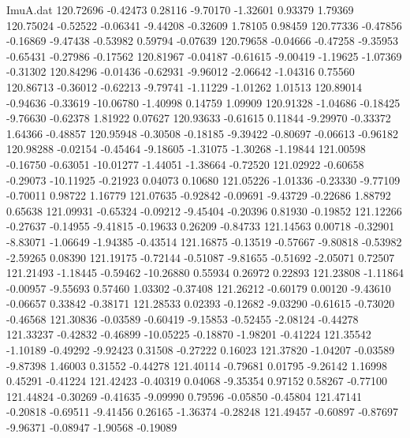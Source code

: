 \begin{filecontents}{ImuA.dat}
 120.72696   -0.42473    0.28116   -9.70170   -1.32601    0.93379    1.79369
 120.75024   -0.52522   -0.06341   -9.44208   -0.32609    1.78105    0.98459
 120.77336   -0.47856   -0.16869   -9.47438   -0.53982    0.59794   -0.07639
 120.79658   -0.04666   -0.47258   -9.35953   -0.65431   -0.27986   -0.17562
 120.81967   -0.04187   -0.61615   -9.00419   -1.19625   -1.07369   -0.31302
 120.84296   -0.01436   -0.62931   -9.96012   -2.06642   -1.04316    0.75560
 120.86713   -0.36012   -0.62213   -9.79741   -1.11229   -1.01262    1.01513
 120.89014   -0.94636   -0.33619  -10.06780   -1.40998    0.14759    1.09909
 120.91328   -1.04686   -0.18425   -9.76630   -0.62378    1.81922    0.07627
 120.93633   -0.61615    0.11844   -9.29970   -0.33372    1.64366   -0.48857
 120.95948   -0.30508   -0.18185   -9.39422   -0.80697   -0.06613   -0.96182
 120.98288   -0.02154   -0.45464   -9.18605   -1.31075   -1.30268   -1.19844
 121.00598   -0.16750   -0.63051  -10.01277   -1.44051   -1.38664   -0.72520
 121.02922   -0.60658   -0.29073  -10.11925   -0.21923    0.04073    0.10680
 121.05226   -1.01336   -0.23330   -9.77109   -0.70011    0.98722    1.16779
 121.07635   -0.92842   -0.09691   -9.43729   -0.22686    1.88792    0.65638
 121.09931   -0.65324   -0.09212   -9.45404   -0.20396    0.81930   -0.19852
 121.12266   -0.27637   -0.14955   -9.41815   -0.19633    0.26209   -0.84733
 121.14563    0.00718   -0.32901   -8.83071   -1.06649   -1.94385   -0.43514
 121.16875   -0.13519   -0.57667   -9.80818   -0.53982   -2.59265    0.08390
 121.19175   -0.72144   -0.51087   -9.81655   -0.51692   -2.05071    0.72507
 121.21493   -1.18445   -0.59462  -10.26880    0.55934    0.26972    0.22893
 121.23808   -1.11864   -0.00957   -9.55693    0.57460    1.03302   -0.37408
 121.26212   -0.60179    0.00120   -9.43610   -0.06657    0.33842   -0.38171
 121.28533    0.02393   -0.12682   -9.03290   -0.61615   -0.73020   -0.46568
 121.30836   -0.03589   -0.60419   -9.15853   -0.52455   -2.08124   -0.44278
 121.33237   -0.42832   -0.46899  -10.05225   -0.18870   -1.98201   -0.41224
 121.35542   -1.10189   -0.49292   -9.92423    0.31508   -0.27222    0.16023
 121.37820   -1.04207   -0.03589   -9.87398    1.46003    0.31552   -0.44278
 121.40114   -0.79681    0.01795   -9.26142    1.16998    0.45291   -0.41224
 121.42423   -0.40319    0.04068   -9.35354    0.97152    0.58267   -0.77100
 121.44824   -0.30269   -0.41635   -9.09990    0.79596   -0.05850   -0.45804
 121.47141   -0.20818   -0.69511   -9.41456    0.26165   -1.36374   -0.28248
 121.49457   -0.60897   -0.87697   -9.96371   -0.08947   -1.90568   -0.19089

\end{filecontents}
